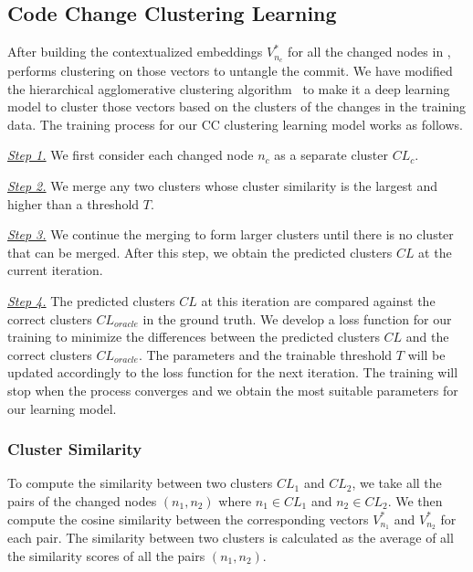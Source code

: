 
\subsection{Code Change Clustering Learning}
\label{clustering:sec}

After building the contextualized embeddings $V^{*}_{n_c}$ for all the
changed nodes in {\mvpdg}, {\tool} performs clustering on those
vectors to untangle the commit. We have modified the hierarchical
agglomerative clustering algorithm~\cite{yi} to make it a deep
learning model to cluster those vectors based on the clusters of the
changes in the training data. The training process for our CC
clustering learning model works  as follows.

{\em \underline{Step 1.}} We first consider each changed node $n_c$ as a
separate cluster $CL_c$.

{\em \underline{Step 2.}} We merge any two clusters whose cluster
similarity is the largest and higher than a threshold $T$.

{\em \underline{Step 3.}} We continue the merging to form larger
clusters until there is no cluster that can be merged. After this
step, we obtain the predicted clusters $CL$ at the current iteration.

{\em \underline{Step 4.}} The predicted clusters $CL$ at this iteration
are compared against the correct clusters $CL_{oracle}$ in the ground
truth. We develop a loss function for our training to minimize the
differences between the predicted clusters $CL$ and the correct
clusters $CL_{oracle}$. The parameters and the trainable threshold $T$
will be updated accordingly to the loss function for the next
iteration. The training will stop when the process converges and we
obtain the most suitable parameters for our learning model.

\subsubsection*{{\bf Cluster Similarity}} To compute the similarity between
two clusters $CL_1$ and $CL_2$, we take all the pairs of the changed
nodes $(n_1,n_2)$ where $n_1 \in CL_1$ and $n_2 \in CL_2$. We
then compute the cosine similarity between the corresponding vectors
$V^{*}_{n_1}$ and $V^{*}_{n_2}$ for each pair. The similarity between
two clusters is calculated as the average of all the similarity scores
of all the pairs $(n_1,n_2)$.

